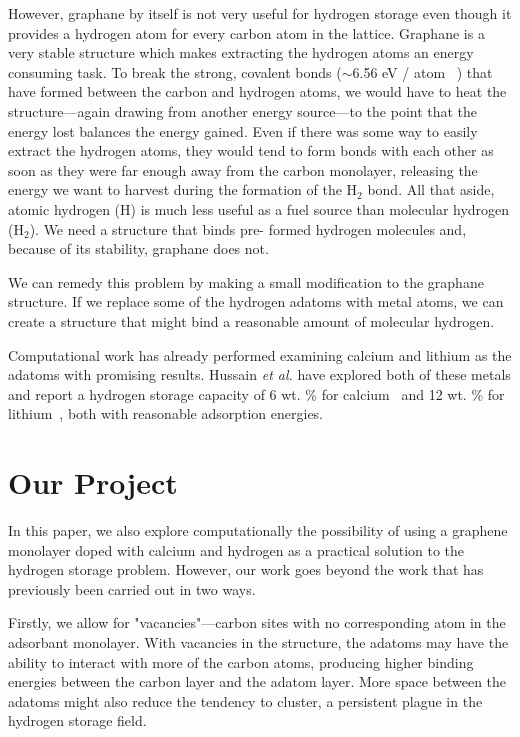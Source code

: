 \documentclass[oneside, noacknowlegments]{BYUPhys}
\begin{document}
However, graphane by itself is not very useful for hydrogen storage 
even though it provides a hydrogen atom for every carbon atom in 
the lattice. Graphane is a very stable structure which makes 
extracting the hydrogen atoms an energy consuming task. To break 
the strong, covalent bonds ($\sim$6.56 eV / atom 
~\cite{SofoChaudhari2007}) that have formed between the carbon and 
hydrogen atoms, we would have to heat the structure---again drawing 
from another energy source---to the point that the energy lost 
balances the energy gained.  Even if there was some way to easily 
extract the hydrogen atoms, they would tend to form bonds with each 
other as soon as they were far enough away from the carbon 
monolayer, releasing the energy we want to harvest during the 
formation of the $\mathrm{H_{2}}$ bond.  All that aside, atomic 
hydrogen (H) is much less useful as a fuel source than molecular 
hydrogen ($\mathrm{H_{2}}$).  We need a structure that binds pre-
formed hydrogen molecules and, because of its stability, graphane 
does not.

We can remedy this problem by making a small modification to the 
graphane structure. If we replace some of the hydrogen adatoms with 
metal atoms, we can create a structure that might bind a reasonable 
amount of molecular hydrogen. 

Computational work has already performed examining calcium and 
lithium as the adatoms with promising results. Hussain \textit{et 
al.} have explored both of these metals and report a hydrogen 
storage capacity of 6 wt. \% for calcium~\cite{HussainPathak2012} 
and 12 wt. \% for lithium~\cite{HussainDeSarkar2012, 
HussainMaark2012, HussainDeSarkar2014, HussainPathak2011}, both 
with reasonable adsorption energies.

\section{Our Project}
\label{sec:our_project}

In this paper, we also explore computationally the possibility of 
using a graphene monolayer doped with calcium and hydrogen as a 
practical solution to the hydrogen storage problem. However, our 
work goes beyond the work that has previously been carried out in 
two ways. 

Firstly, we allow for "vacancies"---carbon sites with no 
corresponding atom in the adsorbant monolayer.  With vacancies in 
the structure, the adatoms may have the ability to interact with 
more of the carbon atoms, producing higher binding energies between 
the carbon layer and the adatom layer.  More space between the 
adatoms might also reduce the tendency to cluster, a persistent 
plague in the hydrogen storage field.
\end{document}
